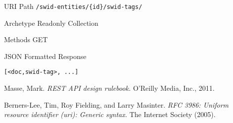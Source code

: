 \documentclass[10pt,a4paper]{scrartcl}
\begin{document}
\begin{mdframed}[style=def]
\begin{description*}
	\item[URI Path] \texttt{/swid-entities/\{id\}/swid-tags/}
	\item[Archetype] Readonly Collection
	\item[Methods] GET
	\item[JSON Formatted Response] \hfill
\begin{lstlisting}
[<doc,swid-tag>, ...]
\end{lstlisting}
\end{description*}
\end{mdframed}


\pagebreak


\begin{thebibliography}{1}
	Masse, Mark. 
	\emph{REST API design rulebook.} 
	O'Reilly Media, Inc., 2011.
	
	Berners-Lee, Tim, Roy Fielding, and Larry Masinter. 
	\emph{RFC 3986: Uniform resource identifier (uri): Generic syntax.}
	The Internet Society (2005).
		
\end{thebibliography}
\end{document}
